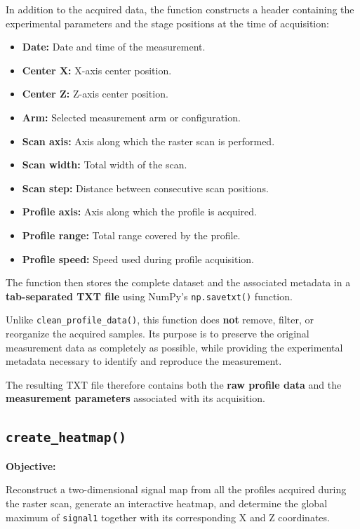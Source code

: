 \documentclass[../../main.tex]{subfiles}
\begin{document}
In addition to the acquired data, the function constructs a header containing
the experimental parameters and the stage positions at the time of
acquisition:

\begin{itemize}
    \item \textbf{Date:} Date and time of the measurement.
    \item \textbf{Center X:} X-axis center position.
    \item \textbf{Center Z:} Z-axis center position.
    \item \textbf{Arm:} Selected measurement arm or configuration.
    \item \textbf{Scan axis:} Axis along which the raster scan is performed.
    \item \textbf{Scan width:} Total width of the scan.
    \item \textbf{Scan step:} Distance between consecutive scan positions.
    \item \textbf{Profile axis:} Axis along which the profile is acquired.
    \item \textbf{Profile range:} Total range covered by the profile.
    \item \textbf{Profile speed:} Speed used during profile acquisition.
\end{itemize}

The function then stores the complete dataset and the associated metadata in
a \textbf{tab-separated TXT file} using NumPy's
\texttt{np.savetxt()} function.

Unlike \texttt{clean\_profile\_data()}, this function does \textbf{not}
remove, filter, or reorganize the acquired samples. Its purpose is to
preserve the original measurement data as completely as possible, while
providing the experimental metadata necessary to identify and reproduce the
measurement.

The resulting TXT file therefore contains both the
\textbf{raw profile data} and the \textbf{measurement parameters} associated
with its acquisition.


\subsection{\texttt{create\_heatmap()}}

\textbf{Objective:}

Reconstruct a two-dimensional signal map from all the profiles acquired
during the raster scan, generate an interactive heatmap, and determine the
global maximum of \texttt{signal1} together with its corresponding X and Z
coordinates.
\end{document}

